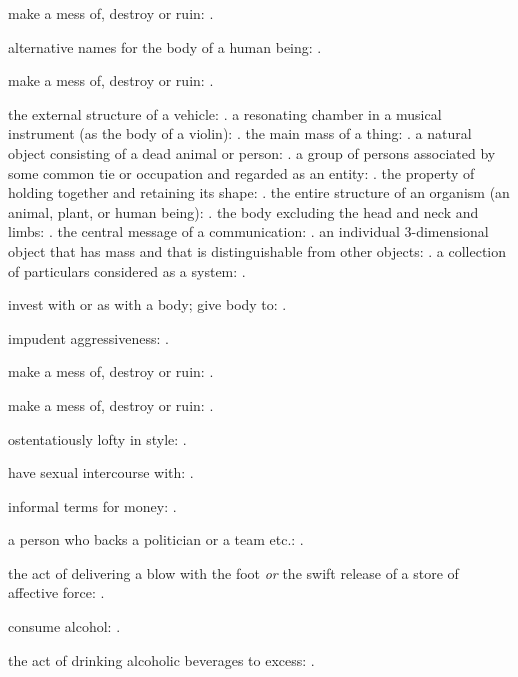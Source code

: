   make a mess of, destroy or ruin: .

  alternative names for the body of a human being: .

  make a mess of, destroy or ruin: .

  the external structure of a vehicle: . a resonating chamber in a musical instrument (as the body of a violin): . the main mass of a thing: . a natural object consisting of a dead animal or person: . a group of persons associated by some common tie or occupation and regarded as an entity: . the property of holding together and retaining its shape: . the entire structure of an organism (an animal, plant, or human being): . the body excluding the head and neck and limbs: . the central message of a communication: . an individual 3-dimensional object that has mass and that is distinguishable from other objects: . a collection of particulars considered as a system: .

  invest with or as with a body; give body to: .

  impudent aggressiveness: .

  make a mess of, destroy or ruin: .

  make a mess of, destroy or ruin: .

  ostentatiously lofty in style: .

  have sexual intercourse with: .

  informal terms for money: .

  a person who backs a politician or a team etc.: .

  the act of delivering a blow with the foot \textit{or} the swift release of a store of affective force: .

  consume alcohol: .

  the act of drinking alcoholic beverages to excess: .

